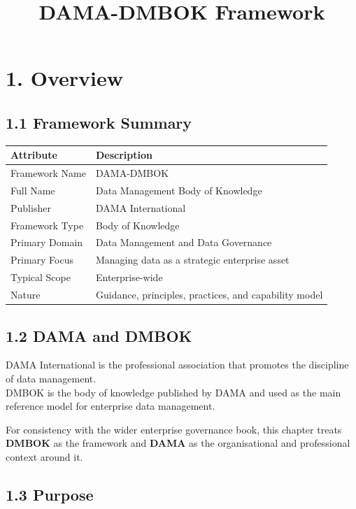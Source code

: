 \documentclass[
  letterpaper,
  DIV=11,
  numbers=noendperiod]{scrartcl}
\title{DAMA-DMBOK Framework}
\author{}
\date{}
\begin{document}
\maketitle


\section{1. Overview}\label{overview}

\subsection{1.1 Framework Summary}\label{framework-summary}

\begin{longtable}[]{@{}ll@{}}
\toprule\noalign{}
Attribute & Description \\
\midrule\noalign{}
\endhead
\bottomrule\noalign{}
\endlastfoot
Framework Name & DAMA-DMBOK \\
Full Name & Data Management Body of Knowledge \\
Publisher & DAMA International \\
Framework Type & Body of Knowledge \\
Primary Domain & Data Management and Data Governance \\
Primary Focus & Managing data as a strategic enterprise asset \\
Typical Scope & Enterprise-wide \\
Nature & Guidance, principles, practices, and capability model \\
\end{longtable}

\subsection{1.2 DAMA and DMBOK}\label{dama-and-dmbok}

DAMA International is the professional association that promotes the
discipline of data management.\\
DMBOK is the body of knowledge published by DAMA and used as the main
reference model for enterprise data management.

For consistency with the wider enterprise governance book, this chapter
treats \textbf{DMBOK} as the framework and \textbf{DAMA} as the
organisational and professional context around it.

\subsection{1.3 Purpose}\label{purpose}
\end{document}
